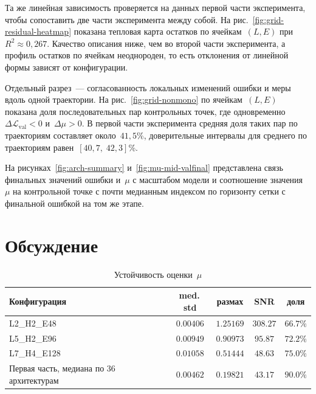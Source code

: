 \documentclass[11pt]{ubs}
\begin{document}
Та же линейная зависимость проверяется на данных первой части эксперимента, чтобы сопоставить две части эксперимента между собой.
На рис.~\ref{fig:grid-residual-heatmap} показана тепловая карта остатков по ячейкам~$(L,E)$ при~$R^2\approx 0{,}267$.
Качество описания ниже, чем во второй части эксперимента, а профиль остатков по ячейкам неоднороден, то есть отклонения от линейной формы зависят от конфигурации.

Отдельный разрез~--- согласованность локальных изменений ошибки и меры вдоль одной траектории.
На рис.~\ref{fig:grid-nonmono} по ячейкам~$(L,E)$ показана доля последовательных пар контрольных точек, где одновременно~$\Delta\mathcal{L}_{\mathrm{val}}<0$ и~$\Delta\mu>0$.
В первой части эксперимента средняя доля таких пар по траекториям составляет около~$41{,}5$\%, доверительные интервалы для среднего по траекториям равен~$[40{,}7,\;42{,}3]$\%.

На рисунках~\ref{fig:arch-summary} и~\ref{fig:mu-mid-valfinal} представлена связь финальных значений ошибки и~$\mu$ с масштабом модели и соотношение значения~$\mu$ на контрольной точке с почти медианным индексом по горизонту сетки с финальной ошибкой на том же этапе.

\section{Обсуждение}

\begin{table}[htbp]
\centering
\caption{Устойчивость оценки~$\mu$}
\label{tab:noise-floor}
\footnotesize
\setlength{\tabcolsep}{3pt}
\begin{tabularx}{\linewidth}{|>{\raggedright\arraybackslash}X|c|c|c|c|}
\hline
Конфигурация & med.\,std & размах & SNR & доля \\
\hline
L2\_H2\_E48 & $0.00406$ & $1.25169$ & $308.27$ & $66.7\%$ \\
L5\_H2\_E96 & $0.00949$ & $0.90973$ & $95.87$ & $72.2\%$ \\
L7\_H4\_E128 & $0.01058$ & $0.51444$ & $48.63$ & $75.0\%$ \\
Первая часть, медиана по 36 архитектурам & $0.00462$ & $0.19821$ & $43.17$ & $90.0\%$ \\
\hline
\end{tabularx}
\end{table}
\end{document}
